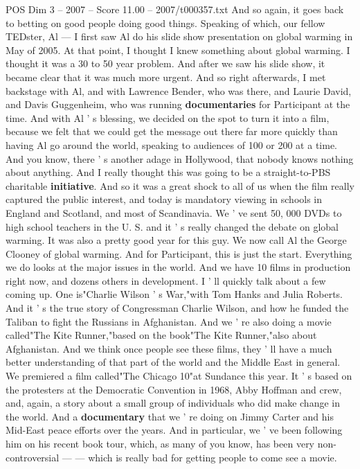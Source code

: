 \begin{textsample}{POS Dim 3 – 2007 – Score 11.00 – 2007/t000357.txt}
And so again, it goes back to betting on good people doing good things.
Speaking of which, our fellow TEDster, Al — I first saw Al do his slide show presentation on global warming in May of 2005.
At that point, I thought I knew something about global warming.
I thought it was a 30 to 50 year problem.
And after we saw his slide show, it became clear that it was much more urgent.
And so right afterwards, I met backstage with Al, and with Lawrence Bender, who was there, and Laurie David, and Davis Guggenheim, who was running \textbf{documentaries} for Participant at the time.
And with Al ' s blessing, we decided on the spot to turn it into a film, because we felt that we could get the message out there far more quickly than having Al go around the world, speaking to audiences of 100 or 200 at a time.
And you know, there ' s another adage in Hollywood, that nobody knows nothing about anything.
And I really thought this was going to be a straight-to-PBS charitable \textbf{initiative}.
And so it was a great shock to all of us when the film really captured the public interest, and today is mandatory viewing in schools in England and Scotland, and most of Scandinavia.
We ' ve sent 50, 000 DVDs to high school teachers in the U.
S. and it ' s really changed the debate on global warming.
It was also a pretty good year for this guy.
We now call Al the George Clooney of global warming.
And for Participant, this is just the start.
Everything we do looks at the major issues in the world.
And we have 10 films in production right now, and dozens others in development.
I ' ll quickly talk about a few coming up.
One is"Charlie Wilson ' s War,"with Tom Hanks and Julia Roberts.
And it ' s the true story of Congressman Charlie Wilson, and how he funded the Taliban to fight the Russians in Afghanistan.
And we ' re also doing a movie called"The Kite Runner,"based on the book"The Kite Runner,"also about Afghanistan.
And we think once people see these films, they ' ll have a much better understanding of that part of the world and the Middle East in general.
We premiered a film called"The Chicago 10"at Sundance this year.
It ' s based on the protesters at the Democratic Convention in 1968, Abby Hoffman and crew, and, again, a story about a small group of individuals who did make change in the world.
And a \textbf{documentary} that we ' re doing on Jimmy Carter and his Mid-East peace efforts over the years.
And in particular, we ' ve been following him on his recent book tour, which, as many of you know, has been very non- controversial — — which is really bad for getting people to come see a movie.

\end{textsample}
